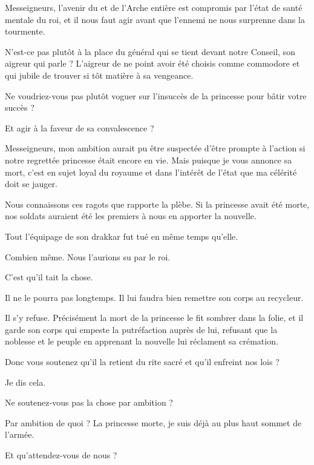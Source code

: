 \begin{drama}
  \generalspeaks Messeigneurs, l’avenir du \campprincipal{} et de l’Arche entière est compromis par l’état de santé mentale du roi,  et il nous faut agir avant que l’ennemi ne nous surprenne dans la tourmente.

  \nobleOnespeaks N’est-ce pas plutôt à la place du  général qui se tient devant notre Conseil, son aigreur qui parle ? L’aigreur de ne point avoir été choisis comme commodore et qui jubile de trouver si tôt matière à sa vengeance.

  \nobleTwospeaks Ne voudriez-vous pas plutôt voguer sur l’insuccès de la princesse pour bâtir votre succès ?

  \nobleTreespeaks Et agir à la faveur de sa convalescence ?

  \generalspeaks Messeigneurs, mon  ambition aurait pu être suspectée  d’être prompte à l’action si notre regrettée princesse était encore en vie. Mais puisque je vous annonce sa mort, c’est en sujet loyal du royaume et dans l’intérêt de l’état que ma célérité doit se jauger.

  \nobleOnespeaks Nous connaissons ces ragots que rapporte la plèbe. Si la princesse avait été morte, nos soldats auraient été les premiers à nous en apporter la nouvelle.

  \generalspeaks Tout l’équipage de son drakkar fut tué en même temps qu’elle.

  \nobleTwospeaks Combien même. Nous l’aurions su par le roi.

  \generalspeaks C’est qu’il tait la chose.

  \nobleTreespeaks Il ne le pourra pas longtemps. Il lui faudra bien remettre son corps au recycleur.

  \generalspeaks Il s’y refuse. Précisément la mort de la princesse le fit sombrer dans la folie, et il garde son corps qui empeste la putréfaction auprès de lui, refusant que la noblesse et le peuple en apprenant la nouvelle lui réclament sa crémation.

  \nobleTreespeaks Donc vous soutenez qu’il la retient du rite sacré et qu’il enfreint nos lois ?

  \generalspeaks Je dis cela.

  \nobleTwospeaks Ne soutenez-vous pas la chose par ambition ?

  \generalspeaks Par ambition de quoi ? La princesse morte, je suis déjà au plus haut sommet de l’armée.

  \nobleOnespeaks Et qu’attendez-vous de nous ?


\end{drama}
